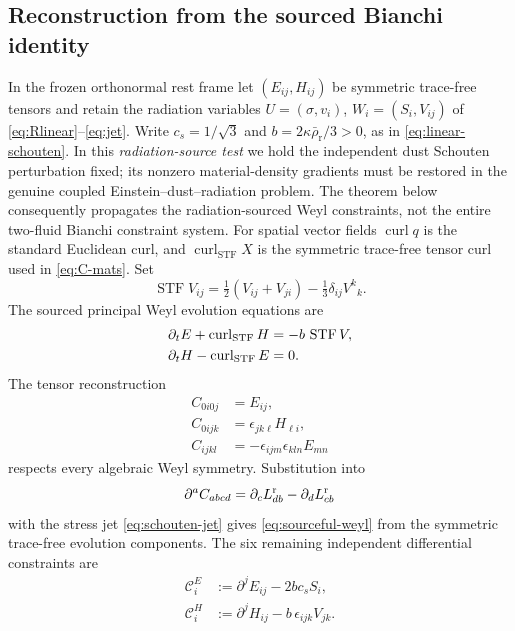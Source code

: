 \documentclass[11pt,a4paper]{article}
\begin{document}
\subsection{Reconstruction from the sourced Bianchi identity}
In the frozen orthonormal rest frame
let $(E_{ij},H_{ij})$ be symmetric
trace-free tensors and retain the
radiation variables $U=(\sigma,v_i)$,
$W_i=(S_i,V_{ij})$ of
\eqref{eq:Rlinear}--\eqref{eq:jet}.
Write $c_s=1/\sqrt3$ and
$b=2\kappa\bar\rho_{\mathrm r}/3>0$,
as in \eqref{eq:linear-schouten}.
In this \emph{radiation-source test} we
hold the independent dust Schouten
perturbation fixed; its nonzero
material-density gradients must be
restored in the genuine coupled
Einstein--dust--radiation problem.
The theorem below consequently
propagates the radiation-sourced
Weyl constraints, not the entire
two-fluid Bianchi constraint system.
For spatial vector fields
$\operatorname{curl} q$ is
the standard Euclidean curl, and
$\operatorname{curl}_{\mathrm{STF}}X$
is the symmetric trace-free tensor
curl used in \eqref{eq:C-mats}.
Set
\[
\operatorname{STF}V_{ij}
=\tfrac12(V_{ij}+V_{ji})
-\tfrac13\delta_{ij}V^k{}_k.
\]
The sourced principal Weyl evolution
equations are
\begin{equation}\label{eq:sourceful-weyl}
\begin{aligned}
\partial_tE+\operatorname{curl}_{\rm STF}H
&=-b\,\operatorname{STF}V,\\
\partial_tH-\operatorname{curl}_{\rm STF}E&=0.
\end{aligned}
\end{equation}
The tensor reconstruction
\begin{equation}\label{eq:weyl-reconstruction}
\begin{aligned}
C_{0i0j}&=E_{ij},\\
C_{0ijk}&=\epsilon_{jk\ell}H_{\ell i},\\
C_{ijkl}&=-\epsilon_{ijm}\epsilon_{kln}E_{mn}
\end{aligned}
\end{equation}
respects every algebraic Weyl symmetry.
Substitution into
\begin{equation}\label{eq:sourced-bianchi}
\partial^a C_{abcd}
=\partial_cL^{\rm r}_{db}
-\partial_dL^{\rm r}_{cb}
\end{equation}
with the stress jet \eqref{eq:schouten-jet}
gives \eqref{eq:sourceful-weyl}
from the symmetric trace-free
evolution components. The six
remaining independent differential
constraints are
\begin{equation}\label{eq:CECH}
\boxed{\quad
\begin{aligned}
\mathcal C^E_i
&:=\partial^jE_{ij}-2bc_sS_i,\\
\mathcal C^H_i
&:=\partial^jH_{ij}
-b\,\epsilon_{ijk}V_{jk}.
\end{aligned}
\quad}
\end{equation}
\end{document}
